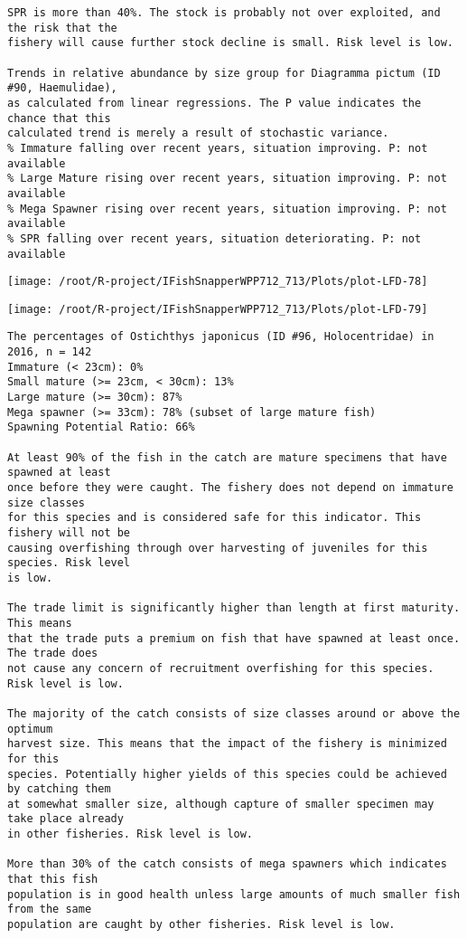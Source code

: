 \documentclass{report}\usepackage[]{graphicx}\usepackage[]{color}
\makeatletter
\def\maxwidth{ %
  \ifdim\Gin@nat@width>\linewidth
    \linewidth
  \else
    \Gin@nat@width
  \fi
}
\newenvironment{kframe}{%
 \def\at@end@of@kframe{}%
 \ifinner\ifhmode%
  \def\at@end@of@kframe{\end{minipage}}%
  \begin{minipage}{\columnwidth}%
 \fi\fi%
 \def\FrameCommand##1{\hskip\@totalleftmargin \hskip-\fboxsep
 \colorbox{shadecolor}{##1}\hskip-\fboxsep
     \hskip-\linewidth \hskip-\@totalleftmargin \hskip\columnwidth}%
 \MakeFramed {\advance\hsize-\width
   \@totalleftmargin\z@ \linewidth\hsize
   \@setminipage}}%
 {\par\unskip\endMakeFramed%
 \at@end@of@kframe}
\newenvironment{knitrout}{}{} %
\makeatother
\begin{document}
\begin{knitrout}
\begin{kframe}
\begin{verbatim}
SPR is more than 40%. The stock is probably not over exploited, and the risk that the
fishery will cause further stock decline is small. Risk level is low.
 
Trends in relative abundance by size group for Diagramma pictum (ID #90, Haemulidae),
as calculated from linear regressions. The P value indicates the chance that this
calculated trend is merely a result of stochastic variance.
% Immature falling over recent years, situation improving. P: not available
% Large Mature rising over recent years, situation improving. P: not available
% Mega Spawner rising over recent years, situation improving. P: not available
% SPR falling over recent years, situation deteriorating. P: not available
\end{verbatim}
\end{kframe}
\texttt{[image: /root/R-project/IFishSnapperWPP712\_713/Plots/plot-LFD-78]} 

\texttt{[image: /root/R-project/IFishSnapperWPP712\_713/Plots/plot-LFD-79]} 
\begin{kframe}\begin{verbatim}
The percentages of Ostichthys japonicus (ID #96, Holocentridae) in 2016, n = 142
Immature (< 23cm): 0%
Small mature (>= 23cm, < 30cm): 13%
Large mature (>= 30cm): 87%
Mega spawner (>= 33cm): 78% (subset of large mature fish)
Spawning Potential Ratio: 66%
 
At least 90% of the fish in the catch are mature specimens that have spawned at least
once before they were caught. The fishery does not depend on immature size classes
for this species and is considered safe for this indicator. This fishery will not be
causing overfishing through over harvesting of juveniles for this species. Risk level
is low.

The trade limit is significantly higher than length at first maturity.  This means
that the trade puts a premium on fish that have spawned at least once. The trade does
not cause any concern of recruitment overfishing for this species. Risk level is low.

The majority of the catch consists of size classes around or above the optimum
harvest size. This means that the impact of the fishery is minimized for this
species. Potentially higher yields of this species could be achieved by catching them
at somewhat smaller size, although capture of smaller specimen may take place already
in other fisheries. Risk level is low.

More than 30% of the catch consists of mega spawners which indicates that this fish
population is in good health unless large amounts of much smaller fish from the same
population are caught by other fisheries. Risk level is low.
 

\end{verbatim}
\end{kframe}
\end{knitrout}
\end{document}
